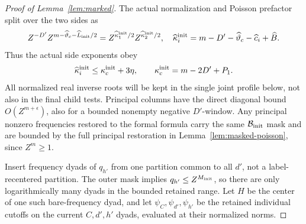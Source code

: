 \documentclass[12pt]{article}
\begin{document}
\begin{proof}[Proof of Lemma~\ref{lem:marked}]
The actual normalization and Poisson prefactor split over the two sides as
\[
 Z^{-D'}Z^{m-\widehat\vartheta_c-\widehat L_{\rm init}/2}
   =Z^{\widehat\kappa_1^{\rm init}/2}
      Z^{\widehat\kappa_2^{\rm init}/2},
 \quad
 \widehat\kappa_i^{\rm init}=m-D'-\widehat\vartheta_c-\widehat c_i+\widehat B.
\]
Thus the actual side exponents obey
\begin{equation}\label{eq:initial-poisson-prefactor}
 \widehat\kappa_i^{\rm init}\le\kappa_c^{\rm init}+3\eta,
 \qquad \kappa_c^{\rm init}=m-2D'+P_1.
\end{equation}
All normalized real inverse roots will be kept in the single joint
profile below, not also in the final child tests.
Principal columns have the direct diagonal bound \(O(Z^{m+\epsilon})\),
also for a bounded nonempty negative \(D'\)-window.  Any principal nonzero
frequencies restored to the formal formula carry the same
\(\mathcal B_{\rm init}\) mask and are bounded by the full principal
restoration in Lemma~\ref{lem:masked-poisson}, since \(Z^m\ge1\).

Insert frequency dyads of \(q_{h'}\) from one partition common to all
\(d'\), not a label-recentered partition.  The outer mask implies
\(q_{h'}\le Z^{M_{\rm init}}\), so there are only logarithmically many
dyads in the bounded retained range.  Let \(H\) be the center of one
such bare-frequency dyad, and let \(\psi_C,\psi_{d'},\psi_{h'}\)
be the retained individual cutoffs on the current \(C,d',h'\) dyads,
evaluated at their normalized norms.


\end{proof}
\end{document}
